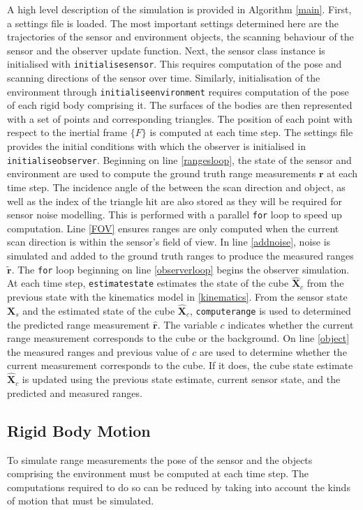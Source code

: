 A high level description of the simulation is provided in Algorithm \ref{main}.	
First, a settings file is loaded. The most important settings determined here are the trajectories of the sensor and environment objects, the scanning behaviour of the sensor and the observer update function.
Next, the sensor class instance is initialised with \texttt{initialisesensor}. This requires computation of the pose and scanning directions of the sensor over time. Similarly, initialisation of the environment through \texttt{initialiseenvironment} requires computation of the pose of each rigid body comprising it. The surfaces of the bodies are then represented with a set of points and corresponding triangles. The position of each point with respect to the inertial frame $\{F\}$ is computed at each time step. The settings file provides the initial conditions with which the observer is initialised in \texttt{initialiseobserver}. 
Beginning on line \ref{rangesloop}, the state of the sensor and environment are used to compute the ground truth range measurements $\mathbf{r}$ at each time step. The incidence angle of the between the scan direction and object, as well as the index of the triangle hit are also stored as they will be required for sensor noise modelling. This is performed with a parallel \texttt{for} loop to speed up computation. Line \ref{FOV} ensures ranges are only computed when the current scan direction is within the sensor's field of view.
In line \ref{addnoise}, noise is simulated and added to the ground truth ranges to produce the measured ranges $\tilde{\mathbf{r}}$.
The \texttt{for} loop beginning on line \ref{observerloop} begins the observer simulation. 
At each time step, \texttt{estimatestate} estimates the state of the cube $\hat{\mathbf{X}}_c$ from the previous state with the kinematics model in \ref{kinematics}.
From the sensor state $\mathbf{X}_s$ and the estimated state of the cube $\hat{\mathbf{X}}_c$, \texttt{computerange} is used to determined the predicted range measurement $\hat{\mathbf{r}}$.
The variable $c$ indicates whether the current range measurement corresponds to the cube or the background. On line \ref{object} the measured ranges and previous value of $c$ are used to determine whether the current measurement corresponds to the cube. If it does, the cube state estimate $\hat{\mathbf{X}}_c$ is updated using the previous state estimate, current sensor state, and the predicted and measured ranges.


\subsection{Rigid Body Motion} \label{motion}
To simulate range measurements the pose of the sensor and the objects comprising the environment must be computed at each time step. The computations required to do so can be reduced by taking into account the kinds of motion that must be simulated.

